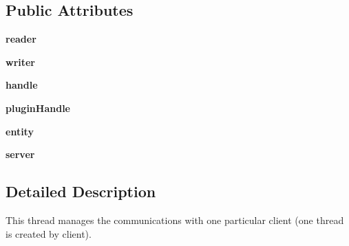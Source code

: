 \subsection*{\-Public \-Attributes}
\begin{DoxyCompactItemize}
\item 
\hypertarget{classnetwork_1_1_server_connection_af5084b55a486eebc40ea6c24cbfcc337}{{\bfseries reader}}\label{classnetwork_1_1_server_connection_af5084b55a486eebc40ea6c24cbfcc337}

\item 
\hypertarget{classnetwork_1_1_server_connection_aef54f357fd46b50f54006b999a2f54ec}{{\bfseries writer}}\label{classnetwork_1_1_server_connection_aef54f357fd46b50f54006b999a2f54ec}

\item 
\hypertarget{classnetwork_1_1_server_connection_ac05b83aca4479be68d65d260a6cb9882}{{\bfseries handle}}\label{classnetwork_1_1_server_connection_ac05b83aca4479be68d65d260a6cb9882}

\item 
\hypertarget{classnetwork_1_1_server_connection_ad94a2f09f0d783fb74bcfd69891280c7}{{\bfseries plugin\-Handle}}\label{classnetwork_1_1_server_connection_ad94a2f09f0d783fb74bcfd69891280c7}

\item 
\hypertarget{classnetwork_1_1_server_connection_ac8e3086a76124ee9449998f99c95adf1}{{\bfseries entity}}\label{classnetwork_1_1_server_connection_ac8e3086a76124ee9449998f99c95adf1}

\item 
\hypertarget{classnetwork_1_1_server_connection_a3b7560c8cd5b2d3bfd5a66a644297d60}{{\bfseries server}}\label{classnetwork_1_1_server_connection_a3b7560c8cd5b2d3bfd5a66a644297d60}

\end{DoxyCompactItemize}


\subsection{\-Detailed \-Description}
\begin{DoxyVerb}
This thread manages the communications with one particular client (one
thread is created by client).
\end{DoxyVerb}
 

